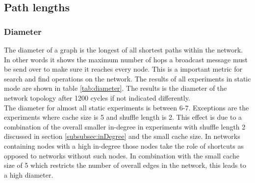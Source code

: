 \begin{figure}
\begin{subfigure}{.5\textwidth}

\end{subfigure}
\end{figure}
\FloatBarrier
\subsection{Path lengths}
\subsubsection{Diameter}
\label{subsubsec:diameter}
The diameter of a graph is the longest of all shortest paths within the network.
In other words it shows the maximum number of hops a broadcast message must be
send over to make sure it reaches every node. This is a important metric for
search and find operations on the network. The results of all experiments in
static mode are shown in table \ref{tab:diameter}. The results is the
diameter of the network topology after 1200 cycles if not indicated
differently.\\
The diameter for almost all static experiments is between 6-7. Exceptions are
the experiments where cache size is 5 and shuffle length is 2. This effect
is due to a combination of the overall smaller in-degree in experiments with
shuffle length 2 discussed in section \ref{subsubsec:inDegree} and the small
cache size. In networks containing nodes with a high in-degree those nodes take
the role of shortcuts as opposed to networks without such nodes. In combination
with the small cache size of 5 which restricts the number of overall edges in
the network, this leads to a high diameter.  


